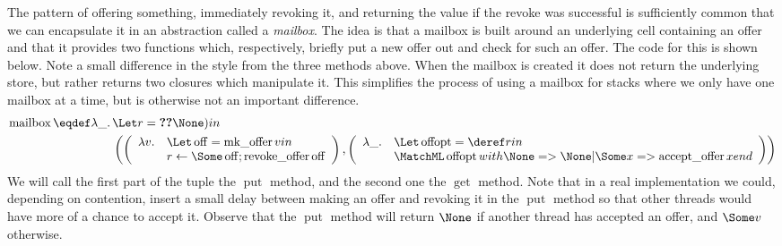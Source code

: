 The pattern of offering something, immediately revoking it, and returning the value if the revoke was successful is sufficiently common that we can encapsulate it in an abstraction called a \emph{mailbox}.
The idea is that a mailbox is built around an underlying cell containing an offer and that it provides two functions which, respectively, briefly put a new offer out and check for such an offer.
The code for this is shown below.
Note a small difference in the style from the three methods above.
When the mailbox is created it does not return the underlying store, but rather returns two closures which manipulate it.
This simplifies the process of using a mailbox for stacks where we only have one mailbox at a time, but is otherwise not an important difference.
\newcommand{\mailbox}{\ensuremath{\operatorname{mailbox}}}
\newcommand{\mbput}{\ensuremath{\operatorname{put}}}
\newcommand{\mbget}{\ensuremath{\operatorname{get}}}
\begin{align*}
  \mailbox \eqdef \lambda \_.\, &\Let r = \Ref(\None) in\\
  &\left(\left(\begin{array}{ll}
      \lambda v. &\Let \operatorname{off} = \mkoffer v in\\
                  & r \gets \Some \operatorname{off}; \revoke \operatorname{off}
    \end{array}\right),
    \left(\begin{array}{ll}
       \lambda \_.&
       \Let \operatorname{offopt} = \deref r in\\
                  &\MatchML \operatorname{offopt} with
                    \None=>\None|{\Some x}=>{\accept x}end{}
          \end{array}\right)
                    \right)
\end{align*}
We will call the first part of the tuple the $\mbput$ method, and the second one the $\mbget$ method.
Note that in a real implementation we could, depending on contention, insert a small delay between making an offer and revoking it in the $\mbput$ method so that other threads would have more of a chance to accept it.
Observe that the $\mbput$ method will return $\None$ if another thread has accepted an offer, and $\Some v$ otherwise.


